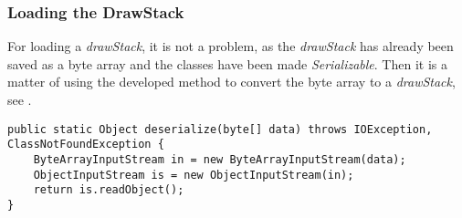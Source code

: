 \subsubsection*{Loading the DrawStack}
For loading a \textit{drawStack}, it is not a problem, as the \textit{drawStack} has already been saved as a byte array and the classes have been made \textit{Serializable}.
Then it is a matter of using the developed method to convert the byte array to a \textit{drawStack}, see .

\begin{lstlisting}[caption={Method for converting byte array to object}, label=lst:desrialize]
public static Object deserialize(byte[] data) throws IOException, ClassNotFoundException {
	ByteArrayInputStream in = new ByteArrayInputStream(data);
	ObjectInputStream is = new ObjectInputStream(in);
	return is.readObject();
}
\end{lstlisting}
